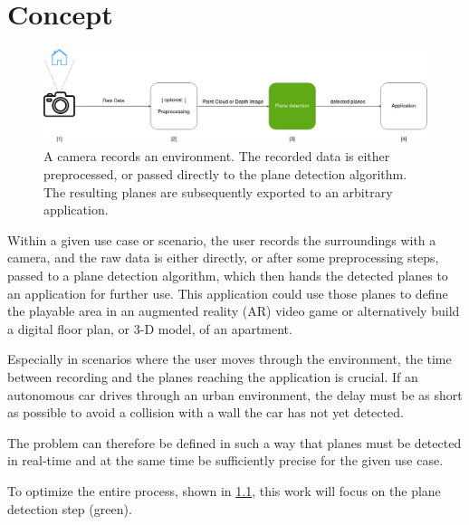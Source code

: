 \documentclass[main.tex]{subfiles}
\begin{document}
\chapter{Concept} \label{chap:Concept}


\begin{figure}[!ht]
    \centering
    \includegraphics[width=15 cm]{images/concept.png}
    \caption{A camera records an environment. The recorded data is either preprocessed, or passed directly to the plane detection algorithm.
        The resulting planes are subsequently exported to an arbitrary application.}
    \label{fig:concept}
\end{figure}



Within a given use case or scenario, the user records the surroundings with a camera, and the raw data is either
directly, or after some preprocessing steps, passed to a plane detection algorithm, which then hands the detected planes to an application for further use.
This application could use those planes to define the playable area in an augmented reality (AR) video game or alternatively build a digital floor
plan, or 3-D model, of an apartment.

Especially in scenarios where the user moves through the environment, the time between recording and the planes reaching the application is crucial.
If an autonomous car drives through an urban environment, the delay must be as short as possible to avoid a collision with a wall the car has not yet detected.

The problem can therefore be defined in such a way that planes must be detected in real-time and at the same time be sufficiently precise for the given use case.

To optimize the entire process, shown in \ref{fig:concept}, this work will focus on the plane detection step (green).
\end{document}
